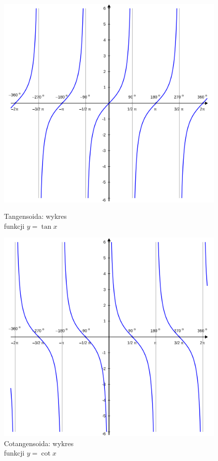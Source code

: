 \documentclass[a4paper,12pt]{article}
\begin{document}
\begin{figure}[h]
    \begin{minipage}{0.5\textwidth}
        \includegraphics[width=0.9\linewidth]{Tan_proportional.png} 
        \caption{Tangensoida: wykres \\\hspace{\textwidth} funkcji $y = \tan x$}
        \label{fig:wykres-tangens}
    \end{minipage}%
    \begin{minipage}{0.5\textwidth}
        \includegraphics[width=0.9\linewidth]{Cotan_proportional.png}
        \caption{Cotangensoida: wykres \\\hspace{\textwidth} funkcji $y = \cot x$}
        \label{fig:wykres-cotangens}
    \end{minipage}
\end{figure}
\end{document}
